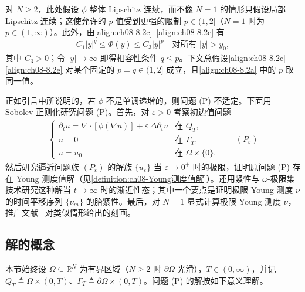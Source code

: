 \documentclass[../../main.tex]{subfiles}%
\begin{document}
\begin{remark}\label{remark:ch08-8.1.1}
对 $N\geqslant2$，此处假设 $\phi$ 整体 Lipschitz 连续，而不像 $N=1$ 的情形只假设局部 Lipschitz 连续；这使允许的 $p$ 值受到更强的限制 $p\in(1,2]$（$N=1$ 时为 $p\in(1,\infty)$）。此外，由\eqref{align:ch08-8.2c}--\eqref{align:ch08-8.2e} 有
\begin{align}
C_1|y|^q\leqslant\Phi(y)\leqslant C_3|y|^p\quad\text{对所有 }|y|>y_0, \label{align:ch08-8.3}
\end{align}
其中 $C_3>0$；令 $|y|\to\infty$ 即得相容性条件 $q\leqslant p$。下文总假设\eqref{align:ch08-8.2c}--\eqref{align:ch08-8.2e} 对某个固定的 $p=q\in(1,2]$ 成立，且\eqref{align:ch08-8.2a} 中的 $p$ 取同一值。
\end{remark}

正如引言中所说明的，若 $\phi$ 不是单调递增的，则问题 (P) 不适定。下面用 Sobolev 正则化研究问题 (P)。首先，对 $\varepsilon>0$ 考察初边值问题
\begin{align*}
\begin{cases}
\partial_t u=\nabla\cdot[\phi(\nabla u)]+\varepsilon\,\Delta\partial_t u & \text{在 }Q_T,\\
u=0 & \text{在 }\Gamma_T,\\
u=u_0 & \text{在 }\Omega\times\{0\}.
\end{cases}
\qquad(P_\varepsilon)
\end{align*}
然后研究逼近问题族 $(P_\varepsilon)$ 的解族 $\{u_\varepsilon\}$ 当 $\varepsilon\to0^+$ 时的极限，证明原问题 (P) 存在 Young 测度值解（见\cref{definition:ch08-Young测度值解}）。还用紧性与 $\omega$-极限集技术研究这种解当 $t\to\infty$ 时的渐近性态；其中一个要点是证明极限 Young 测度 $\nu$ 的时间平移序列 $\{\nu_m\}$ 的胎紧性。最后，对 $N=1$ 显式计算极限 Young 测度 $\nu$，推广文献~\cite{ref83} 对类似情形给出的刻画。

\subsection{解的概念}\label{subsection:ch08-解的概念}

本节始终设 $\Omega\subseteq\mathbb{R}^N$ 为有界区域（$N\geqslant2$ 时 $\partial\Omega$ 光滑），$T\in(0,\infty)$，并记 $Q_T\triangleq\Omega\times(0,T)$、$\Gamma_T\triangleq\partial\Omega\times(0,T)$。问题 (P) 的解按如下意义理解。
\end{document}
